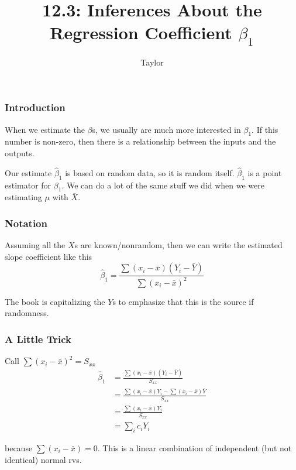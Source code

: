 \documentclass{beamer}
\title["12.3"]{12.3: Inferences About the Regression Coefficient $\beta_1$}
\author{Taylor}
\institute[UVA] 
{
University of Virginia \\
\medskip
\textit{} 
}
\date{}
\begin{document}

\begin{frame}
\titlepage 
\end{frame}
\begin{frame}
\frametitle{Introduction}

When we estimate the $\beta$s, we usually are much more interested in $\beta_1$. If this number is non-zero, then there is a relationship between the inputs and the outputs. 
\newline

Our estimate $\hat{\beta}_1$ is based on random data, so it is random itself. $\hat{\beta}_1$ is a point estimator for $\beta_1$. We can do a lot of the same stuff we did when we were estimating $\mu$ with $\bar{X}$.

\end{frame}
\begin{frame}
\frametitle{Notation}

Assuming all the $X$s are known/nonrandom, then we can write the estimated slope coefficient like this
\[
\hat{\beta}_1 = \frac{\sum (x_i - \bar{x})(Y_i - \bar{Y})}{\sum(x_i - \bar{x})^2}
\]

The book is capitalizing the $Y$s to emphasize that this is the source if randomness.

\end{frame}
\begin{frame}
\frametitle{A Little Trick}

Call $\sum(x_i - \bar{x})^2 = S_{xx}$
\begin{align*}
\hat{\beta}_1 &= \frac{\sum (x_i - \bar{x})(Y_i - \bar{Y})}{S_{xx}} \\
&= \frac{\sum (x_i - \bar{x})Y_i  - \sum (x_i - \bar{x})\bar{Y}}{S_{xx}}\\
&= \frac{\sum (x_i - \bar{x})Y_i  }{S_{xx}} \\
&= \sum_i c_i Y_i
\end{align*}

because $\sum(x_i - \bar{x}) = 0$. This is a linear combination of independent (but not identical) normal rvs.

\end{frame}
\end{document}
